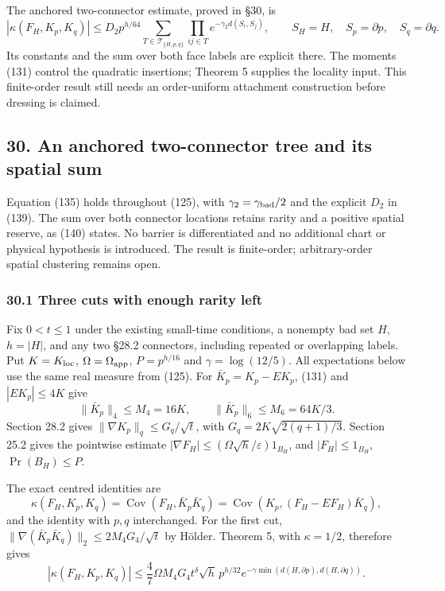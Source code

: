 \documentclass[11pt,a4paper]{article}
\begin{document}
The anchored two-connector estimate, proved in §30, is
\[|\kappa(F_H,K_p,K_q)|
\le D_2p^{h/64}
\sum_{T\in\mathcal T_{\{H,p,q\}}}
 \prod_{ij\in T}e^{-\gamma_2d(S_i,S_j)},\qquad
S_H=H,\quad S_p=\partial p,\quad S_q=\partial q.\tag{135}\] Its
constants and the sum over both face labels are explicit there. The
moments (131) control the quadratic insertions; Theorem 5 supplies the
locality input. This finite-order result still needs an order-uniform
attachment construction before dressing is claimed.

\hypertarget{an-anchored-two-connector-tree-and-its-spatial-sum}{%
\subsection{30. An anchored two-connector tree and its spatial
sum}\label{an-anchored-two-connector-tree-and-its-spatial-sum}}

Equation (135) holds throughout (125), with
\(\gamma_2=\gamma_{\rm bad}/2\) and the explicit \(D_2\) in (139). The
sum over both connector locations retains rarity and a positive spatial
reserve, as (140) states. No barrier is differentiated and no additional
chart or physical hypothesis is introduced. The result is finite-order;
arbitrary-order spatial clustering remains open.

\hypertarget{three-cuts-with-enough-rarity-left}{%
\subsubsection{30.1 Three cuts with enough rarity
left}\label{three-cuts-with-enough-rarity-left}}

Fix \(0<t\le1\) under the existing small-time conditions, a nonempty bad
set \(H\), \(h=|H|\), and any two §28.2 connectors, including repeated
or overlapping labels. Put \(K=K_{\rm loc}\),
\(\Omega=\Omega_{\rm app}\), \(P=p^{h/16}\) and \(\gamma=\log(12/5)\).
All expectations below use the same real measure from (125). For
\(\bar K_p=K_p-EK_p\), (131) and \(|EK_p|\le4K\) give
\[\|\bar K_p\|_4\le M_4=16K,\qquad
\|\bar K_p\|_6\le M_6=64K/3.\tag{136}\] Section 28.2 gives
\(\|\nabla K_p\|_q\le G_q/\sqrt t\), with \(G_q=2K\sqrt{2(q+1)/3}\).
Section 25.2 gives the pointwise estimate
\(|\nabla F_H|\le(\Omega\sqrt h/\varepsilon)1_{B_H}\), and
\(|F_H|\le1_{B_H}\), \(\Pr(B_H)\le P\).

The exact centred identities are \[\kappa(F_H,K_p,K_q)
=\operatorname{Cov}(F_H,\bar K_p\bar K_q)
=\operatorname{Cov}(K_p,(F_H-EF_H)\bar K_q),\] and the identity with
\(p,q\) interchanged. For the first cut,
\(\|\nabla(\bar K_p\bar K_q)\|_2\le2M_4G_4/\sqrt t\) by Hölder. Theorem
5, with \(\kappa=1/2\), therefore gives \[|\kappa(F_H,K_p,K_q)|
\le\frac47\Omega M_4G_4t^\delta\sqrt h\,p^{h/32}
 e^{-\gamma\min(d(H,\partial p),d(H,\partial q))}.
\tag{137}\]
\end{document}
